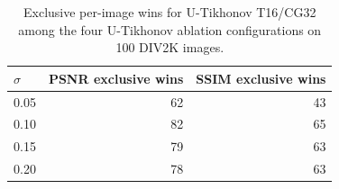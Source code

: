 \begin{table}[htbp]
\centering
\caption{Exclusive per-image wins for U-Tikhonov T16/CG32 among the four U-Tikhonov ablation configurations on 100 DIV2K images.}
\label{tab:u_tikhonov_t16_cg32_best_counts}
\begin{tabular}{lrr}
\toprule
$\sigma$ & PSNR exclusive wins & SSIM exclusive wins \\
\midrule
0.05 & 62 & 43 \\
0.10 & 82 & 65 \\
0.15 & 79 & 63 \\
0.20 & 78 & 63 \\
\bottomrule
\end{tabular}
\end{table}
